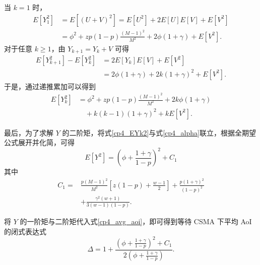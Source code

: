     当 $k=1$ 时，
    \begin{equation}\label{cp4_EY1^2}
        \begin{split}
E\left[Y_1^2\right] &= E\left[(U + V)^2\right] = E\left[U^2\right] + 2E\left[U\right]E\left[V\right] + E\left[V^2\right] \\
&= \phi^2 + zp(1 - p) \frac{(M - 1)^2}{M^2} + 2\phi(1 + \gamma) + E\left[V^2\right].
        \end{split}
    \end{equation}
对于任意 $k \ge 1$，由 $Y_{k+1}=Y_k + V$ 可得
    \begin{equation}\label{cp4_EYK+1^2-EYk^2}
        \begin{split}
E\left[Y_{k+1}^2\right] - E\left[Y_k^2\right] &= 2E\left[Y_k\right]E\left[V\right] + E\left[V^2\right] \\
&= 2\phi(1 + \gamma) + 2k(1 + \gamma)^2 + E\left[V^2\right].
        \end{split}
    \end{equation}
于是，通过递推累加可以得到
    \begin{equation}\label{cp4_EYk2}
        \begin{split}
E\left[Y_k^2\right] &= \phi^2 + zp(1 - p) \frac{(M - 1)^2}{M^2} + 2k\phi(1 + \gamma) \\
&\quad + k(k - 1)(1 + \gamma)^2 + kE\left[V^2\right].
        \end{split}
    \end{equation}

    最后，为了求解 $Y$ 的二阶矩，将式\eqref{cp4_EYk2}与式\eqref{cp4_alpha}联立，根据全期望公式展开并化简，可得
    \begin{equation}\label{cp4_EY2result}
        E\left[Y^2\right] = \left( \phi + \frac{1+\gamma}{1-p} \right)^2 + C_1
    \end{equation}
    其中
    \begin{equation}\label{cp4_C1}
        \begin{aligned}
            C_1 = {} & \frac{p(M-1)^2}{M^2} \left[ z(1-p) + \frac{w-1}{2} \right]
            + \frac{p(1+\gamma)^2}{(1-p)^2} \\
            & + \frac{\gamma^2 (w+1)}{3(w-1)(1-p)}.
        \end{aligned}
    \end{equation}


将 $Y$ 的一阶矩与二阶矩代入式\eqref{cp4_avg_aoi}，即可得到等待 CSMA 下平均 AoI 的闭式表达式
\begin{equation}\label{cp4_AoI_Final}
    \Delta = 1 + \frac{\left( \phi + \frac{1+\gamma}{1-p} \right)^2 + C_1}{2\left( \phi + \frac{1+\gamma}{1-p} \right)}.
\end{equation}
